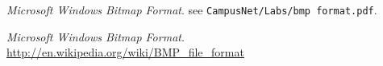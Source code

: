 \renewcommand\bibname{References}

\begin{thebibliography}{10}
\emph{Microsoft Windows Bitmap Format}.
see \texttt{CampusNet/Labs/bmp format.pdf}.

\emph{Microsoft Windows Bitmap Format}.
\url{http://en.wikipedia.org/wiki/BMP_file_format}
\end{thebibliography}
